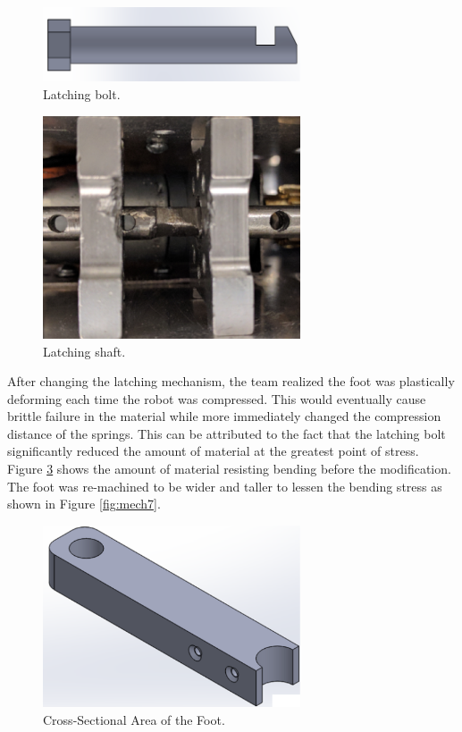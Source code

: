 \documentclass[ece]{uw-wkrpt}
\begin{document}
\begin{figure}
    \centering
    \includegraphics[width=3.0in]{res/mech4}
    \caption[Latching bolt]
          {Latching bolt.}
    \label{fig:mech4}
\end{figure}

\begin{figure}
    \centering
    \includegraphics[width=3.0in]{res/mech5}
    \caption[Latching shaft]
          {Latching shaft.}
    \label{fig:mech5}
\end{figure}

After changing the latching mechanism, the team realized the foot was plastically deforming each time the robot was compressed. This would eventually cause brittle failure in the material while more immediately changed the compression distance of the springs. This can be attributed to the fact that the latching bolt significantly reduced the amount of material at the greatest point of stress. Figure \ref{fig:mech6} shows the amount of material resisting bending before the modification. The foot was re-machined to be wider and taller to lessen the bending stress as shown in Figure \ref{fig:mech7}.

\begin{figure}
    \centering
    \includegraphics[width=3.0in]{res/mech6}
    \caption[Cross section of the Foot]
          {Cross-Sectional Area of the Foot.}
    \label{fig:mech6}
\end{figure}
\end{document}
